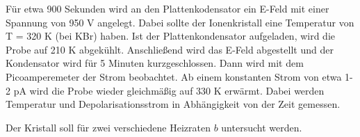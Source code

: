Für etwa 900 Sekunden wird an den Plattenkodensator ein E-Feld mit einer Spannung von 950 V angelegt. Dabei sollte
der Ionenkristall eine Temperatur von T = 320 K (bei KBr) haben.
Ist der Plattenkondensator aufgeladen, wird die Probe auf 210 K abgekühlt. Anschließend wird das E-Feld abgestellt und
der Kondensator wird für 5 Minuten kurzgeschlossen.
Dann wird mit dem Picoamperemeter der Strom beobachtet. Ab einem konstanten Strom von etwa 1-2 pA wird die Probe wieder
gleichmäßig auf 330 K erwärmt. Dabei werden Temperatur und Depolarisationsstrom in Abhängigkeit von der Zeit gemessen.

Der Kristall soll für zwei verschiedene Heizraten $b$ untersucht werden.
